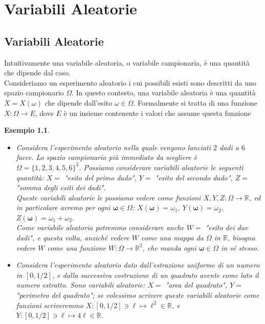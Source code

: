 \documentclass[11pt]{book}
\theoremstyle{Definizione}
\theoremstyle{TeoremaProposizioneLemmaCorollario}
\theoremstyle{OsservazioneNota}
\newtheorem{myes}{Esempio}[section]
\newcommand{\R}{\mathbb{R}}
\newcommand{\mybold}[1]{\boldsymbol{#1}}
\begin{document}
\chapter{Variabili Aleatorie}
\section{Variabili Aleatorie}
Intuitivamente una variabile aleatoria, o variabile campionaria, è una quantità che dipende dal caso.\\
Consideriamo un esperimento aleatorio i cui possibili esisti sono descritti da uno spazio campionario $\Omega$. In questo contesto, una variabile aleatoria è una quantità $X = X(\omega)$ che dipende dall'esito $\omega\in \Omega$. Formalmente si tratta di una funzione $X:\Omega\longrightarrow E$, dove $E$ è un insieme contenente i valori che assume questa funzione
\begin{myes}
\hfill
\begin{itemize}
\item[$(a)$] Considera l'esperimento aleatorio nella quale vengono lanciati $2$ dadi a $6$ facce. Lo spazio campionario più immediato da scegliere è $\Omega = \{1,2,3,4,5,6\}^2$. Possiamo considerare variabili aleatorie le seguenti quantità: $X = $ "esito del primo dado", $Y = $ "esito del secondo dado", $Z = $ "somma degli esiti dei dadi".\\
Queste variabili aleatorie le possiamo vedere come funzioni $X,Y,Z:\Omega\longrightarrow \R$, ed in particolare avremo per ogni $\mybold{\omega}\in \Omega$: $X(\mybold{\omega}) = \omega_1$, $Y(\mybold{\omega}) = \omega_2$, $Z(\mybold{\omega}) = \omega_1+\omega_2$.\\
Come variabile aleatoria potremmo considerare anche $W = $ "esito dei due dadi", e questa volta, anziché vedere $W$ come una mappa da $\Omega$ in $\R$, bisogna vedere $W$ come una funzione $W:\Omega\longrightarrow \R^2$, che manda ogni $\mybold{\omega}\in \Omega$ in sé stesso.
\item[$(b)$] Considera l'esperimento aleatorio dato dall'estrazione uniforme di un numero in $[0,1/2]$, e dalla successiva costruzione di un quadrato avente come lato il numero estratto. Sono variabili aleatorie: $X = $ "area del quadrato", $Y = $ "perimetro del quadrato"; se volessimo scrivere queste variabili aleatorie come funzioni scriveremmo $X:[0,1/2]\ni \ell \longmapsto \ell^2 \in \R$, e $Y : [0,1/2]\ni \ell \longmapsto 4\ell\in \R$.
\end{itemize}
\end{myes}
\end{document}
